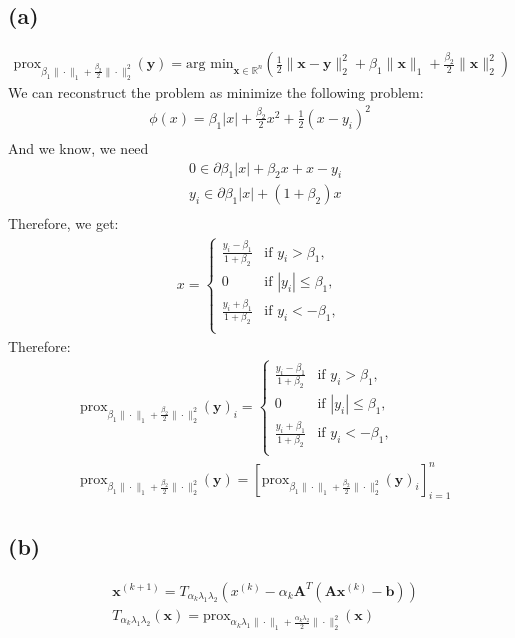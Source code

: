 \documentclass{article}
\newcommand{\R}{\mathbb{R}}
\begin{document}
\subsection*{(a)}
\begin{align*}
    \text{prox}_{\beta_1\|\cdot\|_1 + \frac{\beta_2}{2}\|\cdot\|_2^2}(\bm{y}) = \text{arg min}_{\bm{x} \in \R^n} \left( \frac{1}{2} \|\bm{x} - \bm{y}\|_2^2 + \beta_1\|\bm{x}\|_1 + \frac{\beta_2}{2} \|\bm{x}\|_2^2\right)
\end{align*}
We can reconstruct the problem as minimize the following problem:
\begin{align*}
    \phi(x) = \beta_1 |x| + \frac{\beta_2}{2} x^2 + \frac{1}{2} (x - y_i)^2 \\
\end{align*}
And we know, we need
\begin{align*}
    &0 \in \partial \beta_1 |x| + \beta_2 x + x - y_i \\
    &y_i \in \partial \beta_1 |x| + (1 + \beta_2) x \\
\end{align*}
Therefore, we get:
\begin{align*}
    x = \begin{cases}
        \frac{y_i - \beta_1}{1 + \beta_2} &\text{if } y_i > \beta_1, \\
        0 &\text{if } |y_i| \leq \beta_1, \\
        \frac{y_i + \beta_1}{1 + \beta_2} &\text{if } y_i < -\beta_1, \\
    \end{cases}
\end{align*}
Therefore:
\begin{align*}
    &\text{prox}_{\beta_1\|\cdot\|_1 + \frac{\beta_2}{2}\|\cdot\|_2^2}(\bm{y})_i = \begin{cases}
        \frac{y_i - \beta_1}{1 + \beta_2} &\text{if } y_i > \beta_1, \\
        0 &\text{if } |y_i| \leq \beta_1, \\
        \frac{y_i + \beta_1}{1 + \beta_2} &\text{if } y_i < -\beta_1, \\
    \end{cases}\\
    &\text{prox}_{\beta_1\|\cdot\|_1 + \frac{\beta_2}{2}\|\cdot\|_2^2}(\bm{y}) = [\text{prox}_{\beta_1\|\cdot\|_1 + \frac{\beta_2}{2}\|\cdot\|_2^2}(\bm{y})_i]_{i = 1}^{n}
\end{align*}


\subsection*{(b)}
\begin{align*}
    &\bm{x}^{(k+1)} = T_{\alpha_k \lambda_1 \lambda_2} \left(x^{(k)} - \alpha_k \bm{A}^T(\bm{A}\bm{x}^{(k)} - \bm{b}) \right) \\
    &T_{\alpha_k \lambda_1 \lambda_2}(\bm{x}) = \text{prox}_{\alpha_k\lambda_1\|\cdot\|_1 + \frac{\alpha_k\lambda_2}{2}\|\cdot\|_2^2}(\bm{x})
\end{align*}
\end{document}

